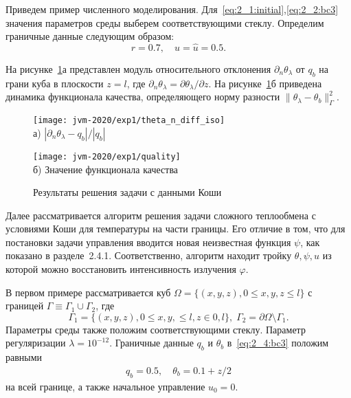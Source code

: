 Приведем пример численного моделирования.
Для~\eqref{eq:2_1:initial},\eqref{eq:2_2:bc3} значения параметров
среды выберем соответствующими стеклу.
Определим граничные данные следующим образом:
\[
    r = 0.7, \quad
    u = \hat u = 0.5.
\]

На рисунке~\ref{fig:4_4:0}а представлен модуль относительного
отклонения $\partial_n\theta_\lambda$ от $q_b$ на грани куба в плоскости $z=l$,
где $\partial_n\theta_\lambda=\partial\theta_\lambda/\partial z$.
На рисунке~\ref{fig:4_4:0}б приведена динамика функционала качества, определяющего норму
разности $\|\theta_\lambda -\theta_b\|^2_\Gamma$.
\begin{figure}[h!t]
    \begin{minipage}[b][][b]{0.49\linewidth}
        \centering
        \texttt{[image: jvm-2020/exp1/theta\_n\_diff\_iso]}
        \\ а) $|\partial_n\theta_\lambda-q_b|/|q_b|$
    \end{minipage}
    \hfill
    \begin{minipage}[b][][b]{0.49\linewidth}
        \centering
        \texttt{[image: jvm-2020/exp1/quality]}
        \\ б) Значение функционала качества
    \end{minipage}
    \caption{Результаты решения задачи с данными Коши}
    \label{fig:4_4:0}
\end{figure}


Далее рассматривается алгоритм решения задачи сложного теплообмена с условиями Коши для
температуры на части границы.
Его отличие в том, что для постановки задачи управления вводится новая неизвестная функция $\psi$,
как показано в разделе~2.4.1.
Соответственно, алгоритм находит тройку $\theta, \psi, u$ из которой можно
восстановить интенсивность излучения $\varphi$.


В первом примере рассматривается куб $\Omega = \{ (x, y, z), 0 \leq x,y,z \leq l \}$ с границей
$\Gamma \equiv \Gamma_1 \cup \Gamma_2$, где
\[
    \Gamma_1 = \{(x, y, z), 0 \leq x,y, \leq l, z \in 0, l\}, \;
    \Gamma_2 = \partial \Omega \setminus \Gamma_1.
\]
Параметры среды также положим соответствующими стеклу.
Параметр регуляризации $\lambda=10^{-12}$.
Граничные данные $q_b$ и $\theta_b$ в~\eqref{eq:2_4:bc3} положим равными
\begin{gather*}
    q_b = 0.5, \quad
    \theta_b = 0.1 + z/2
\end{gather*}
на всей границе, а также начальное управление $u_0 = 0$.


